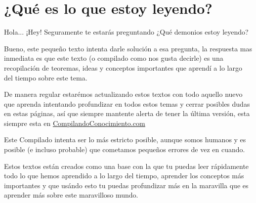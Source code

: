 \documentclass[12pt, fleqn]{report}                             %
\theoremstyle{break}                                            %
\begin{document}
\restoregeometry                                                    %
\nopagecolor                                                        %
\pagecolor{Background}
\color{Foreground}




\tableofcontents{}
\label{sec:Index}

\clearpage





\section{¿Qué es lo que estoy leyendo?}
    
    Hola... ¡Hey! Seguramente te estarás preguntando
    ¿Qué demonios estoy leyendo?

    Bueno, este pequeño texto intenta darle solución a esa pregunta, la respuesta mas inmediata es
    que este texto (o compilado como nos gusta decirle) es una recopilación de teoremas, ideas
    y conceptos importantes que aprendí a lo largo del tiempo sobre este tema.

    De manera regular estarémos actualizando estos textos con todo aquello nuevo que aprenda intentando
    profundizar en todos estos temas y cerrar posibles dudas en estas páginas, así que siempre mantente
    alerta de tener la última versión, esta siempre esta en \href{http://www.CompilandoConocimiento.com}
    {\underline{CompilandoConocimiento.com}} 

    Este Compilado intenta ser lo más estricto posible, aunque somos humanos y es posible (e incluso probable) que
    cometamos pequeños errores de vez en cuando.

    Estos textos están creados como una base con la que tu puedas leer rápidamente todo lo que hemos aprendido
    a lo largo del tiempo, aprender los conceptos más importantes y que usándo esto tu puedas profundizar
    más en la maravilla que es aprender más sobre este maravilloso mundo.
\end{document}
